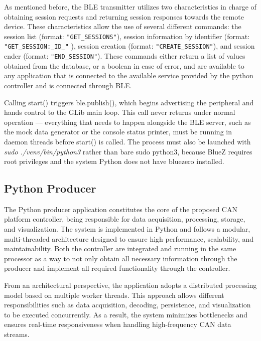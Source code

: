 As mentioned before, the BLE transmitter utilizes two characteristics in charge of obtaining session requests and returning session responses towards the remote device. These characteristics allow the use of several different commands: the session list (format: \texttt{"GET\_SESSIONS"}), session information by identifier (format: \texttt{"GET\_SESSION:\_ID\_"} ), session creation (format: \texttt{"CREATE\_SESSION"}), and session ender (format: \texttt{"END\_SESSION"}). These commands either return a list of values obtained from the database, or a boolean in case of error, and are available to any application that is connected to the available service provided by the python controller and is connected through BLE. 

Calling start() triggers ble.publish(), which begins advertising the peripheral and hands control to the GLib main loop. This call never returns under normal operation — everything that needs to happen alongside the BLE server, such as the mock data generator or the console status printer, must be running in daemon threads before start() is called. The process must also be launched with \textit{sudo ./venv/bin/python3} rather than bare sudo python3, because BlueZ requires root privileges and the system Python does not have bluezero installed.

\subsection{Python Producer}

The Python producer application constitutes the core of the proposed CAN platform controller, being responsible for data acquisition, processing, storage, and visualization. The system is implemented in Python and follows a modular, multi-threaded architecture designed to ensure high performance, scalability, and maintainability. Both the controller are integrated and running in the same processor as a way to not only obtain all necessary information through the producer and implement all required functionality through the controller.

From an architectural perspective, the application adopts a distributed processing model based on multiple worker threads. This approach allows different responsibilities such as data acquisition, decoding, persistence, and visualization to be executed concurrently. As a result, the system minimizes bottlenecks and ensures real-time responsiveness when handling high-frequency CAN data streams.

